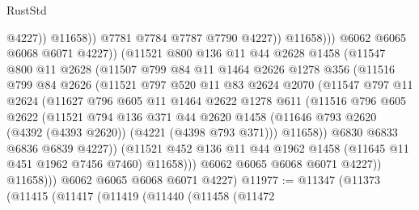 \begin{lexlean}{RustStd}
\begin{coremodule}
{\begin{coremodule}
{{{{{{{{{{{{{{{{{{{{{{{{{{{{{{{                                @4227))
                            @11658))
                        @7781
                        @7784
                        @7787
                        @7790
                        @4227))
                    @11658)))
              @6062
              @6065
              @6068
              @6071
              @4227))
          (@11521
            @800
            @136
            @11
            @44
            @2628
            @1458
            (@11547
              @800
              @11
              @2628
              (@11507
                @799
                @84
                @11
                @1464
                @2626
                @1278
                @356
                (@11516
                  @799
                  @84
                  @2626
                  (@11521
                    @797
                    @520
                    @11
                    @83
                    @2624
                    @2070
                    (@11547
                      @797
                      @11
                      @2624
                      (@11627
                        @796
                        @605
                        @11
                        @1464
                        @2622
                        @1278
                        @611
                        (@11516
                          @796
                          @605
                          @2622
                          (@11521
                            @794
                            @136
                            @371
                            @44
                            @2620
                            @1458
                            (@11646 @793 @2620 (@4392 (@4393 @2620)) (@4221 (@4398 @793 @371)))
                            @11658))
                        @6830
                        @6833
                        @6836
                        @6839
                        @4227))
                    (@11521
                      @452
                      @136
                      @11
                      @44
                      @1962
                      @1458
                      (@11645 @11 @451 @1962 @7456 @7460)
                      @11658)))
                @6062
                @6065
                @6068
                @6071
                @4227))
            @11658)))
      @6062
      @6065
      @6068
      @6071
      @4227)
@11977 := @11347
    (@11373
      (@11415
        (@11417
          (@11419
            (@11440
              (@11458
                (@11472
}}}}}}}}}}}}}}}}}}}}}}}}}}}}}}}
\end{coremodule}}
\end{coremodule}
\end{lexlean}
